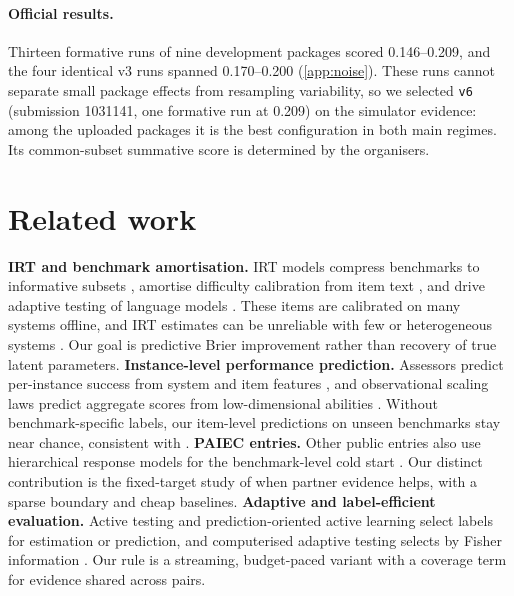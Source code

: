 \documentclass{article}
\begin{document}
\paragraph{Official results.}
Thirteen formative runs of nine development packages scored 0.146--0.209, and the four identical v3 runs spanned 0.170--0.200 (\cref{app:noise}). These runs cannot separate small package effects from resampling variability, so we selected \texttt{v6} (submission 1031141, one formative run at 0.209) on the simulator evidence: among the uploaded packages it is the best configuration in both main regimes. Its common-subset summative score is determined by the organisers.

\section{Related work}
\textbf{IRT and benchmark amortisation.} IRT models \citep{rasch1960,lord1980} compress benchmarks to informative subsets \citep{polo2024tiny}, amortise difficulty calibration from item text \citep{truong2025amortized}, and drive adaptive testing of language models \citep{hofmann2025fluid,krumdick2026}. These items are calibrated on many systems offline, and IRT estimates can be unreliable with few or heterogeneous systems \citep{jiang2026trust}. Our goal is predictive Brier improvement rather than recovery of true latent parameters.
\textbf{Instance-level performance prediction.} Assessors predict per-instance success from system and item features \citep{pacchiardi2025predictaboard,zhou2025adele}, and observational scaling laws predict aggregate scores from low-dimensional abilities \citep{ruan2024observational}. Without benchmark-specific labels, our item-level predictions on unseen benchmarks stay near chance, consistent with \citet{shang2026contextual}.
\textbf{PAIEC entries.} Other public entries also use hierarchical response models for the benchmark-level cold start \citep{doctawho2026,brierrabbit2026}. Our distinct contribution is the fixed-target study of when partner evidence helps, with a sparse boundary and cheap baselines.
\textbf{Adaptive and label-efficient evaluation.} Active testing \citep{kossen2021active,kossen2022ase,berrada2025scaling} and prediction-oriented active learning \citep{bickfordsmith2023epig} select labels for estimation or prediction, and computerised adaptive testing selects by Fisher information \citep{vanderlinden2010,ghosh2021bobcat}. Our rule is a streaming, budget-paced variant with a coverage term for evidence shared across pairs.
\end{document}
